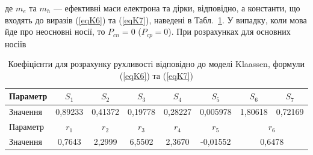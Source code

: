 \documentclass[12pt,a4paper,titlepage,oneside]{book}
\numberwithin{equation}{part}
\begin{document}
де
$m_e$ та $m_h$ --- ефективні маси електрона та дірки, відповідно, а константи, що входять до виразів (\ref{eqK6}) та (\ref{eqK7}),
наведені в Табл.~\ref{tblK2}.
У випадку, коли мова йде про неосновні носії, то $P_{cn}=0$ ($P_{cp}=0$).
При розрахунках для основних носіїв

\begin{table}
\setlength{\tabcolsep}{3pt}
\caption{Коефіцієнти для розрахунку рухливості відповідно до моделі Klaassen, формули (\ref{eqK6}) та (\ref{eqK7})}
\label{tblK2}
\centering
\begin{tabular}{|l|c|c|c|c|c|c|c|}
\hline
Параметр&$S_1$&$S_2$&$S_3$&$S_4$&$S_5$&$S_6$&$S_7$\\
\hline
Значення&0,89233&0,41372&0,19778&0,28227&0,005978&1,80618&0,72169\\
\hline
Параметр&$r_1$&$r_2$&$r_3$&$r_4$&$r_5$&\multicolumn{2}{c|}{$r_6$}\\
\hline
Значення&0,7643&2,2999&6,5502&2,3670&-0,01552&\multicolumn{2}{c|}{0,6478}\\
\hline
\end{tabular}
\end{table}
\end{document}

